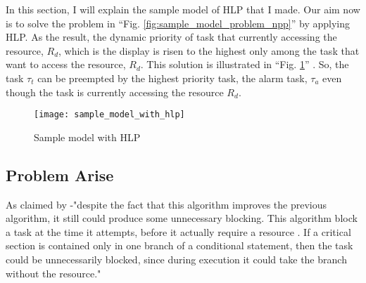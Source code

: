 In this section, I will explain the sample model of HLP that I made. Our aim now is to solve the problem in ``Fig. \ref{fig:sample_model_problem_npp}'' by applying HLP. As the result, the dynamic priority of task that currently accessing the resource, $ R_{d}$, which is the display is risen to the highest only among the task that want to access the resource, $ R_{d}$. This solution is illustrated in ``Fig. \ref{fig:sample_model_with_hlp}'' . So, the task $ \tau_{t}$ can be preempted by the highest priority task, the alarm task, $\tau_{a}$ even though the task is currently accessing the resource $ R_{d}$.


\begin{figure}[ht]
    \centering
    \texttt{[image: sample\_model\_with\_hlp]}
    \caption{Sample model with HLP}
    \label{fig:sample_model_with_hlp}
\end{figure}


\subsection{Problem Arise}

As claimed by \cite{b5} -"despite the fact that this algorithm improves the previous algorithm, it still could produce some unnecessary blocking. This algorithm block a task at the time it attempts, before it actually require a resource \cite{b5}. If a critical section is contained only in one branch of a conditional statement, then the task could be unnecessarily blocked, since during execution it could take the branch without the resource."
 










